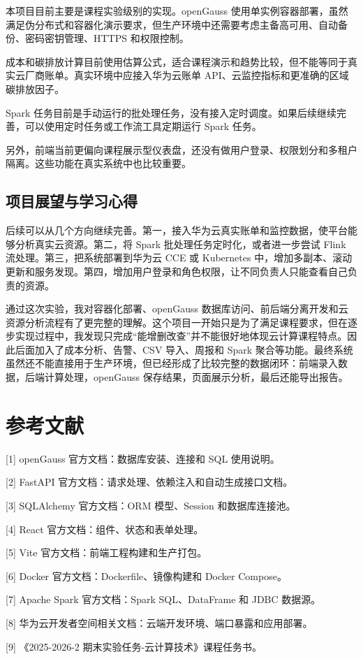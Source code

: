 本项目目前主要是课程实验级别的实现。openGauss
使用单实例容器部署，虽然满足伪分布式和容器化演示要求，但生产环境中还需要考虑主备高可用、自动备份、密码密钥管理、HTTPS
和权限控制。

成本和碳排放计算目前使用估算公式，适合课程演示和趋势比较，但不能等同于真实云厂商账单。真实环境中应接入华为云账单
API、云监控指标和更准确的区域碳排放因子。

Spark
任务目前是手动运行的批处理任务，没有接入定时调度。如果后续继续完善，可以使用定时任务或工作流工具定期运行
Spark 任务。

另外，前端当前更偏向课程展示型仪表盘，还没有做用户登录、权限划分和多租户隔离。这些功能在真实系统中也比较重要。

\section{项目展望与学习心得}\label{ux9879ux76eeux5c55ux671bux4e0eux5b66ux4e60ux5fc3ux5f97}

后续可以从几个方向继续完善。第一，接入华为云真实账单和监控数据，使平台能够分析真实云资源。第二，将
Spark 批处理任务定时化，或者进一步尝试 Flink
流处理。第三，把系统部署到华为云 CCE 或 Kubernetes
中，增加多副本、滚动更新和服务发现。第四，增加用户登录和角色权限，让不同负责人只能查看自己负责的资源。

通过这次实验，我对容器化部署、openGauss
数据库访问、前后端分离开发和云资源分析流程有了更完整的理解。这个项目一开始只是为了满足课程要求，但在逐步实现过程中，我发现只完成``能增删改查''并不能很好地体现云计算课程特点。因此后面加入了成本分析、告警、CSV
导入、周报和 Spark
聚合等功能。最终系统虽然还不能直接用于生产环境，但已经形成了比较完整的数据闭环：前端录入数据，后端计算处理，openGauss
保存结果，页面展示分析，最后还能导出报告。

\chapter{参考文献}\label{ux53c2ux8003ux6587ux732e}

{[}1{]} openGauss 官方文档：数据库安装、连接和 SQL 使用说明。

{[}2{]} FastAPI 官方文档：请求处理、依赖注入和自动生成接口文档。

{[}3{]} SQLAlchemy 官方文档：ORM 模型、Session 和数据库连接池。

{[}4{]} React 官方文档：组件、状态和表单处理。

{[}5{]} Vite 官方文档：前端工程构建和生产打包。

{[}6{]} Docker 官方文档：Dockerfile、镜像构建和 Docker Compose。

{[}7{]} Apache Spark 官方文档：Spark SQL、DataFrame 和 JDBC 数据源。

{[}8{]} 华为云开发者空间相关文档：云端开发环境、端口暴露和应用部署。

{[}9{]} 《2025-2026-2 期末实验任务-云计算技术》课程任务书。
